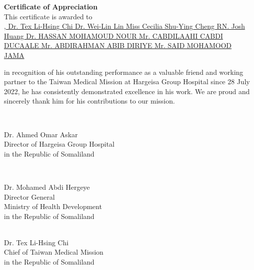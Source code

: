 \documentclass[a4paper, landscape]{article}
\newcommand{\members}[1]{%
    \ifcase#1
    \or Dr. Tex Li-Hsing Chi
    \or Dr. Wei-Lin Lin
    \or Miss Cecilia Shu-Ying Cheng
    \or RN. Josh Huang
    \or Dr. HASSAN MOHAMOUD NOUR %
    \or Mr. CABDILAAHI CABDI DUCAALE
    \or Mr. ABDIRAHMAN ABIB DIRIYE %
    \or Mr. SAID MOHAMOOD JAMA %
    \fi
}
\begin{document}
\begin{center}

{\Huge\textbf{Certificate of Appreciation}}\\[0.6cm]

\raisebox{-0.6\height}{}  \hspace{0.3cm}
This certificate is awarded to \hspace{0.3cm}
\raisebox{-0.6\height}{} \\[0.4cm]

{\Huge\underline{\members{5,}}}\\[0.2cm]



\begin{flushleft}
\Large
in recognition of his outstanding performance as a valuable friend and working partner to the Taiwan Medical Mission at Hargeisa Group Hospital since 28 July 2022, he has consistently demonstrated excellence in his work.
We are proud and sincerely thank him for his contributions to our mission.

\end{flushleft}\\[0.3cm]


\begin{minipage}{0.4\textwidth}
\begin{flushleft} \large
Dr. Ahmed Omar Askar \\
Director of Hargeisa Group Hospital\\
in the Republic of Somaliland \\

\end{flushleft}
\end{minipage}
~
\begin{minipage}{0.4\textwidth}
\begin{flushright} \large
Dr. Mohamed Abdi Hergeye\\
Director General \\
Ministry of Health Development \\
in the Republic of Somaliland

\end{flushright}
\end{minipage}\\[0.5cm]

\large
Dr. Tex Li-Hsing Chi\\
Chief of Taiwan Medical Mission\\
in the Republic of Somaliland

\end{center}
\end{document}

